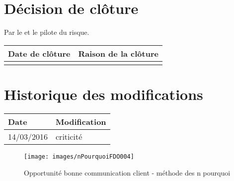 \section*{Décision de clôture}
Par le \CP{} et le pilote du risque.
\begin{table}[h]
\centering
	\begin{tabularx}{16.8cm}{|X|X|}
	\hline
	\rowcolor{gray!40} Date de clôture & Raison de la clôture \\
	\hline
	  & \\
	\hline
	\end{tabularx}
\end{table}

\section*{Historique des modifications}
\begin{table}[h]
\centering
	\begin{tabularx}{16.8cm}{|X|X|}
	\hline
	\rowcolor{gray!40} Date & Modification \\%
	\hline
	 14/03/2016 & criticité \\
	\hline
	\end{tabularx}
\end{table}
\newpage


\begin{figure}
	\centering
	\texttt{[image: images/nPourquoiFDO004]}
	\caption{\label{opportunite bonne communication client}Opportunité bonne communication client - méthode des n pourquoi}
\end{figure}
